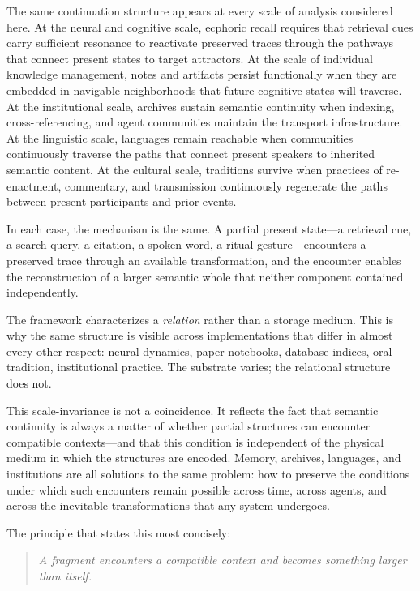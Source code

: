 \documentclass[12pt]{article}
\begin{document}
The same continuation structure appears at every scale of analysis
considered here.
At the neural and cognitive scale, ecphoric recall requires that retrieval
cues carry sufficient resonance to reactivate preserved traces through the
pathways that connect present states to target attractors.
At the scale of individual knowledge management, notes and artifacts
persist functionally when they are embedded in navigable neighborhoods
that future cognitive states will traverse.
At the institutional scale, archives sustain semantic continuity when
indexing, cross-referencing, and agent communities maintain the transport
infrastructure.
At the linguistic scale, languages remain reachable when communities
continuously traverse the paths that connect present speakers to inherited
semantic content.
At the cultural scale, traditions survive when practices of re-enactment,
commentary, and transmission continuously regenerate the paths between
present participants and prior events.

In each case, the mechanism is the same.
A partial present state---a retrieval cue, a search query, a citation,
a spoken word, a ritual gesture---encounters a preserved trace through
an available transformation, and the encounter enables the reconstruction
of a larger semantic whole that neither component contained independently.

The framework characterizes a \emph{relation} rather than a storage medium.
This is why the same structure is visible across implementations that
differ in almost every other respect: neural dynamics, paper notebooks,
database indices, oral tradition, institutional practice.
The substrate varies; the relational structure does not.

This scale-invariance is not a coincidence.
It reflects the fact that semantic continuity is always a matter of
whether partial structures can encounter compatible contexts---and that
this condition is independent of the physical medium in which the
structures are encoded.
Memory, archives, languages, and institutions are all solutions to the
same problem: how to preserve the conditions under which such encounters
remain possible across time, across agents, and across the inevitable
transformations that any system undergoes.

The principle that states this most concisely:

\begin{quote}
\textit{A fragment encounters a compatible context and becomes something
larger than itself.}
\end{quote}
\end{document}
